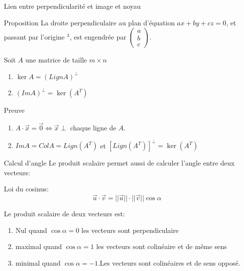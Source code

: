 \begin{parag}{Lien entre perpendicularité et image et noyau}
    \begin{subparag}{Proposition}
        La droite perpendiculaire au plan d’équation $ax + by + cz = 0$, et passant par l'origine \R$^3$, est engendrée par $\begin{pmatrix}
            a \\b \\ c
        \end{pmatrix}$.
    \end{subparag}
    \begin{theoreme}
        Soit $A$ une matrice de taille $m \times n$
        \begin{enumerate}
            \item $\ker A = (LignA)^\perp$
            \item $(ImA)^\perp = \ker(A^T)$
        \end{enumerate}
    \end{theoreme}
    \begin{subparag}{Preuve}
        \begin{enumerate}
            \item $A\cdot\vec{x} = \vec{0} \Leftrightarrow \vec{x}\perp$ chaque ligne de $A$.
            \item  $ImA = ColA = Lign(A^T)$ et $[Lign(A^T)]^\perp = \ker(A^T)$
        \end{enumerate}
    \end{subparag}

\end{parag}

\begin{parag}{Calcul d'angle}
 Le produit scalaire permet aussi de calculer l'angle entre deux vecteurs:
 \begin{theoreme}
     Loi du cosinus:
     \[\vec{u}\cdot \vec{v} = ||\vec{u}||\cdot ||\vec{v}||\cos \alpha\]
 \end{theoreme}
 Le produit scalaire de deux vecteurs est:
 \begin{enumerate}
     \item Nul quand $\cos\alpha = 0$ les vecteurs sont perpendiculaire
     \item maximal quand $\cos \alpha = 1$ les vecteurs sont colinéaire et de même sens
     \item minimal quand $\cos\alpha = -1$.Les vecteurs sont colinéaires et de sens opposé.
 \end{enumerate}
\end{parag}


